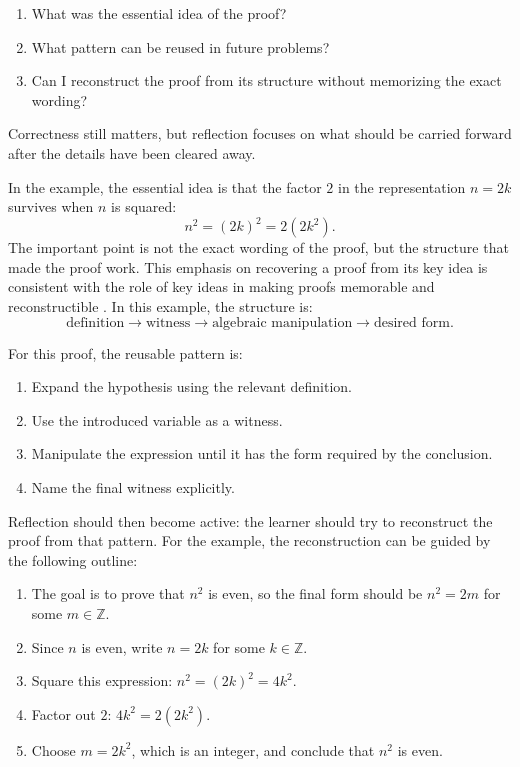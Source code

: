 \documentclass[11pt,a4paper]{article}
\begin{document}
\begin{enumerate}[label=\arabic*., leftmargin=*]
    \item What was the essential idea of the proof?
    \item What pattern can be reused in future problems?
    \item Can I reconstruct the proof from its structure without memorizing the exact wording?
\end{enumerate}

Correctness still matters, but reflection focuses on what should be carried forward after the details have been cleared away.

In the example, the essential idea is that the factor \(2\) in the representation \(n = 2k\) survives when \(n\) is squared:
\[
    n^2 = (2k)^2 = 2(2k^2).
\]
The important point is not the exact wording of the proof, but the structure that made the proof work. This emphasis on recovering a proof from its key idea is consistent with the role of key ideas in making proofs memorable and reconstructible \cite{hanna2014key}. In this example, the structure is:
\[
    \text{definition}
    \rightarrow
    \text{witness}
    \rightarrow
    \text{algebraic manipulation}
    \rightarrow
    \text{desired form}.
\]

For this proof, the reusable pattern is:

\begin{enumerate}[label=\arabic*., leftmargin=*]
    \item Expand the hypothesis using the relevant definition.
    \item Use the introduced variable as a witness.
    \item Manipulate the expression until it has the form required by the conclusion.
    \item Name the final witness explicitly.
\end{enumerate}

Reflection should then become active: the learner should try to reconstruct the proof from that pattern. For the example, the reconstruction can be guided by the following outline:

\begin{enumerate}[label=\arabic*., leftmargin=*]
    \item The goal is to prove that \(n^2\) is even, so the final form should be \(n^2 = 2m\) for some \(m \in \mathbb{Z}\).
    \item Since \(n\) is even, write \(n = 2k\) for some \(k \in \mathbb{Z}\).
    \item Square this expression: \(n^2 = (2k)^2 = 4k^2\).
    \item Factor out \(2\): \(4k^2 = 2(2k^2)\).
    \item Choose \(m = 2k^2\), which is an integer, and conclude that \(n^2\) is even.
\end{enumerate}
\end{document}
